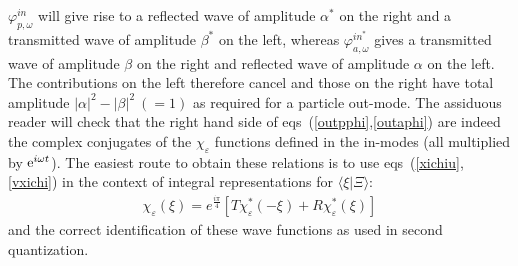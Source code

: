 \documentclass[12pt,oneside]{report}
\begin{document}
$\varphi^{in}_{p,\omega}$ will give rise to a reflected wave of
amplitude $ \alpha^*$ on the right and a transmitted wave of amplitude $\beta^*$
on the left,
whereas $\varphi^{in^*}_{a,\omega}$ gives a transmitted wave
of amplitude $ \beta$ on the right and reflected wave of amplitude
$\alpha$ on the left.  The contributions on the left therefore
cancel and those on the right have total amplitude $|\alpha|^2 -
|\beta|^2\ (= 1)$ as required 
for a particle out-mode. 
The assiduous reader will check that the
right hand side
of eqs~(\ref{outpphi},\ref{outaphi}) are indeed the complex conjugates of
the $\chi_{\varepsilon}$
functions defined in the in-modes (all multiplied by ${\rm e}^{i\omega t}$).
 The easiest route to obtain these relations is to use  
eqs~(\ref{xichiu},\ref{vxichi}) in the context of integral
representations
for $\langle\xi|\Xi \rangle$:
\begin{eqnarray}
\chi_{\varepsilon}(\xi)=e^{\frac{i\pi}{4}} \left[ T
\chi^*_{\varepsilon}(-\xi)+R\chi^*_{\varepsilon}(\xi) \right]
\end{eqnarray} 
 and the correct identification of these wave
functions as 
used in second quantization. 
\end{document}
